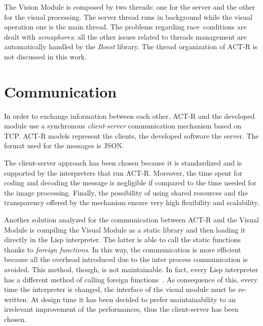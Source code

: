 	
	The Vision Module is composed by two threads: one for the server and the other for the visual processing. 
	The server thread runs in background while the visual operation one is the main thread.
	The problems regarding \mbox{race conditions} are dealt with \emph{semaphores}; all the other issues related to threads management are automatically handled by the \emph{Boost} library.
	The thread organization of \mbox{ACT-R} is not discussed in this work.	


	\section{Communication}
	In order to exchange information between each other, \mbox{ACT-R} and the developed module use a synchronous \emph{client-server} communication mechanism based on \mbox{TCP}. 
	\mbox{ACT-R} models represent the clients, the developed software the server. 
	The format used for the messages is \mbox{JSON}.  		

	The client-server approach has been chosen because it is standardized and is supported by the interpreters that run \mbox{ACT-R}. 
	Moreover, the time spent for coding and decoding the message is negligible if compared to the time needed for the image processing.
	Finally, the possibility of using shared resources and the transparency offered by the mechanism ensure very high flexibility and scalability.
	

	Another solution analyzed for the communication between \mbox{ACT-R} and the Visual Module is compiling the Visual Module as a static library and then loading it directly in the \mbox{Lisp} interpreter.
	The latter is able to call the static functions thanks to \emph{foreign functions}.
	In this way, the communication is more efficient because all the overhead introduced due to the inter process communication is avoided. 
	This method, though, is not maintainable. 
	In fact, every \mbox{Lisp} interpreter has a different method of calling foreign functions~\cite{SWIGDoc}. 
	As consequence of this, every time the interpreter is changed, the interface of the visual module must be re-written.
 	At design time it has been decided to prefer maintainability to an irrelevant improvement of the performances, thus the client-server has been chosen.

